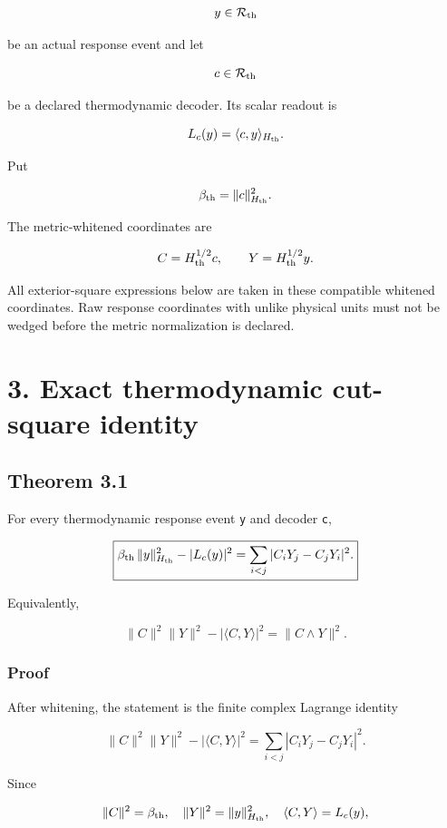 \[
y\in\mathcal R_{\rm th}
\]

be an actual response event and let

\[
c\in\mathcal R_{\rm th}
\]

be a declared thermodynamic decoder. Its scalar readout is

\[
L_c(y)=\langle c,y\rangle_{H_{\rm th}}.
\]

Put

\[
\beta_{\rm th}=\|c\|_{H_{\rm th}}^2.
\]

The metric-whitened coordinates are

\[
C=H_{\rm th}^{1/2}c,
\qquad
Y=H_{\rm th}^{1/2}y.
\]

All exterior-square expressions below are taken in these compatible whitened coordinates. Raw response coordinates with unlike physical units must not be wedged before the metric normalization is declared.

\hypertarget{exact-thermodynamic-cut-square-identity}{%
\section{3. Exact thermodynamic cut-square identity}\label{exact-thermodynamic-cut-square-identity}}

\hypertarget{theorem-3.1}{%
\subsection{Theorem 3.1}\label{theorem-3.1}}

For every thermodynamic response event \texttt{y} and decoder \texttt{c},

\[
\boxed{
\beta_{\rm th}\,\|y\|_{H_{\rm th}}^2
-
|L_c(y)|^2
=
\sum_{i<j}|C_iY_j-C_jY_i|^2.
}
\]

Equivalently,

\[
\boxed{
\|C\|^2\|Y\|^2-|\langle C,Y\rangle|^2
=
\|C\wedge Y\|^2.
}
\]

\hypertarget{proof}{%
\subsubsection{Proof}\label{proof}}

After whitening, the statement is the finite complex Lagrange identity

\[
\|C\|^2\|Y\|^2-|\langle C,Y\rangle|^2
=
\sum_{i<j}|C_iY_j-C_jY_i|^2.
\]

Since

\[
\|C\|^2=\beta_{\rm th},
\quad
\|Y\|^2=\|y\|_{H_{\rm th}}^2,
\quad
\langle C,Y\rangle=L_c(y),
\]

